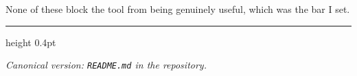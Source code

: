 \documentclass[11pt,a4paper]{article}
\begin{document}
None of these block the tool from being genuinely useful, which was the
bar I set. 

\vspace{20pt}
{\color{hairline}\hrule height 0.4pt}
\vspace{12pt}

\begin{flushright}
\color{mutedgrey}\itshape\small
Canonical version: \texttt{README.md} in the repository.
\end{flushright}
\end{document}
